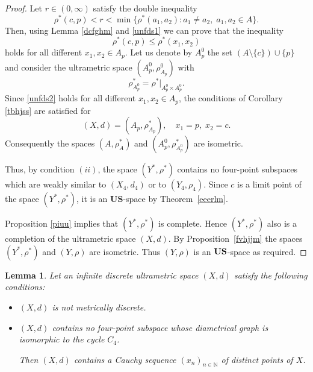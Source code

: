 \documentclass[11pt]{article}
\newtheorem{lemma}[theorem]{Lemma}
\theoremstyle{definition}
\theoremstyle{remark}
\numberwithin{equation}{section}
\begin{document}
\begin{proof}
Let  $r \in (0,\infty)$ satisfy the double inequality
\begin{equation}
    \label{unfds1}
\rho^*(c,p) < r < \min\{ \rho^*(a_1,a_2) : a_1 \ne a_2, \; a_1,a_2 \in A \}.
\end{equation}
Then, using Lemma \ref{dcfghm}  and \eqref{unfds1} we can prove that the inequality
\begin{equation}
    \label{unfds2}
\rho^*(c,p) \leq \rho^*(x_1,x_2) 
\end{equation}
holds for all different $x_1, x_2 \in A_p$.
Let us denote by $A^0_p$ the set $(A \setminus \{c\}) \cup \{p\}$ and consider the ultrametric space $(A_p^0,\rho^0_{A_p})$
with
\[
\rho^*_{A_p^0} = \rho^* \big|_{A_p^0 \times A_p^0}.
\]
Since \eqref{unfds2} holds for all different $x_1, x_2 \in A_p$, the conditions of Corollary \ref{tbhjss} are satisfied for
\[
(X,d) = (A_p, \rho^*_{A_p}), \quad x_1 = p, \; x_2 = c.
\]
Consequently the spaces $(A, \rho^*_A)$ and $(A_p^0, \rho^*_{A_p^0})$ are isometric.


Thus, by condition $(ii)$, the space $(Y^*, \rho^*)$ contains no four-point subspaces which are weakly similar to $(X_4,d_4)$ or to $(Y_4,\rho_4)$.
Since $c$ is a limit point of the space $(Y^*, \rho^*)$, it is an {\bf US}-space by Theorem~\ref{eeerlm}.



Proposition \ref{piuu} implies that $(Y^*,\rho^*)$ is complete. Hence $(Y^*,\rho^*)$ also is a completion of the ultrametric space $(X,d)$. By Proposition~\ref{fvhjjm} the spaces $(Y^*,\rho^*)$ and $(Y,\rho)$ are isometric. Thus $(Y,\rho)$ is an ${\bf US}$-space as required. 

\end{proof}


\begin{lemma}\label{476}
Let an infinite discrete ultrametric space $(X,d)$ satisfy the following conditions:
\begin{itemize}[left=10pt]
    \item[(i)] $(X,d)$ is not metrically discrete.

        \item[(ii)]  $(X,d)$ contains no four-point subspace whose diametrical graph is isomorphic to the cycle $C_4$.

Then $(X,d)$  contains a Cauchy sequence $(x_n)_{n\in \mathbb N}$ of distinct points of $X$.
\end{itemize}

\end{lemma}
\end{document}
